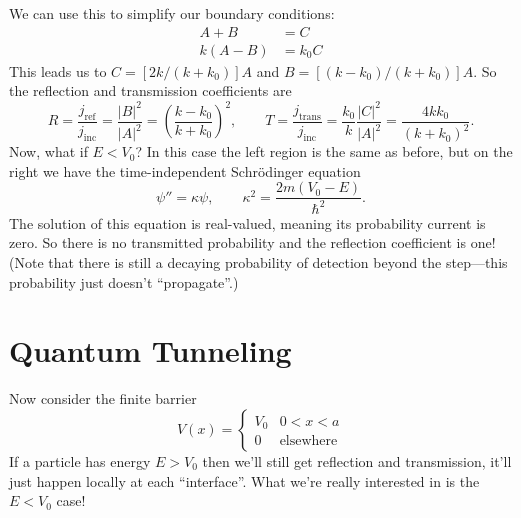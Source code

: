\documentclass[../p052main.tex]{subfiles}
\begin{document}
We can use this to simplify our boundary conditions:
\begin{align*}
    A + B &= C \\
    k(A - B) &= k_0 C
\end{align*}
This leads us to $C = [2k / (k + k_0)] A$ and $B = [(k - k_0) / (k + k_0)]A$.
So the reflection and transmission coefficients are
\[ R = \frac{j_\textrm{ref}}{j_\textrm{inc}} = \frac{|B|^2}{|A|^2} = \left( \frac{k - k_0}{k + k_0} \right)^2, \qquad T = \frac{j_\textrm{trans}}{j_\textrm{inc}} = \frac{k_0}{k} \frac{|C|^2}{|A|^2} = \frac{4kk_0}{(k + k_0)^2}. \]
Now, what if $E < V_0$?
In this case the left region is the same as before, but on the right we have the time-independent Schrödinger equation
\[ \psi'' = \kappa \psi, \qquad \kappa^2 = \frac{2m(V_0 - E)}{\hbar^2}. \]
The solution of this equation is real-valued, meaning its probability current is zero.
So there is no transmitted probability and the reflection coefficient is one!
(Note that there is still a decaying probability of detection beyond the step---this probability just doesn't ``propagate''.)


\section{Quantum Tunneling}
Now consider the finite barrier
\[ V(x) = \begin{cases} V_0 & 0 < x < a \\ 0 & \textrm{elsewhere} \end{cases} \]
If a particle has energy $E > V_0$ then we'll still get reflection and transmission, it'll just happen locally at each ``interface''.
What we're really interested in is the $E < V_0$ case!
\end{document}
